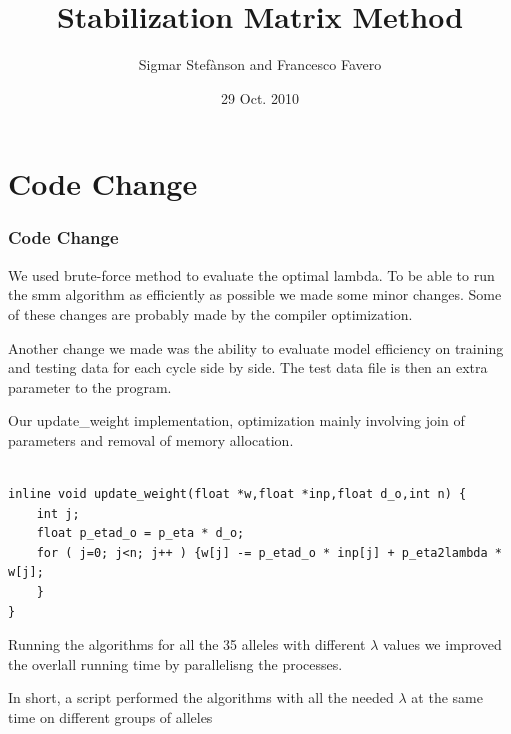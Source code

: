\documentclass[presentation]{beamer}   %
\begin{document}

\author{Sigmar Stef\`{a}nson and Francesco Favero}
\title{Stabilization Matrix Method}
\date{29 Oct. 2010}



\begin{frame}
  \maketitle
\end{frame}


\section{Code Change}
\begin{frame}
  \frametitle{Code Change}
  \begin{block}\centering
  	We used brute-force method to evaluate the optimal lambda. To be able to run the smm algorithm as efficiently as possible we made some minor changes. Some of these changes are probably made by the compiler optimization.
  \end{block}
   \pause
  \begin{block}\centering
  	Another change we made was the ability to evaluate model efficiency on training and testing data for each cycle side by side. The test data file is then an extra parameter to the program.
  \end{block}
\end{frame}

\begin{frame}
Our update\_weight implementation, optimization mainly involving join of parameters and removal of memory allocation.
 \begin{lstlisting}[basicstyle=\scriptsize,format=C]

inline void update_weight(float *w,float *inp,float d_o,int n) {
	int j;
	float p_etad_o = p_eta * d_o;
	for ( j=0; j<n; j++ ) {w[j] -= p_etad_o * inp[j] + p_eta2lambda * w[j];
	}
}
  \end{lstlisting}
  \pause
  \begin{block}\centering
	Running the algorithms for all the 35 alleles with different $\lambda$ values we improved the overlall running time by parallelisng the processes.
	\par In short, a script performed the algorithms with all the needed $\lambda$ at the same time on different groups of alleles
  \end{block}

\end{frame}
\end{document}
